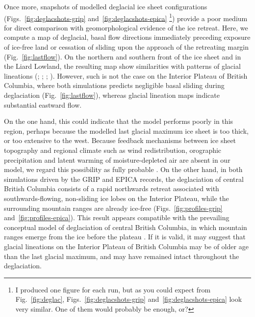 \documentclass[tc, manuscript]{copernicus}
\begin{document}
Once more, snapshots of modelled deglacial ice sheet configurations
(Figs.~\ref{fig:deglacshots-grip} and~\ref{fig:deglacshots-epica}%
\footnote{I produced one figure for each run, but as you could expect from
    Fig.~\ref{fig:deglac}, Figs.~\ref{fig:deglacshots-grip}
    and~\ref{fig:deglacshots-epica} look very similar. One of them would
    probably be enough, or?}) provide a
poor medium for direct comparison with geomorphological evidence of the ice
retreat. Here, we compute a map of deglacial, basal flow directions immediately
preceding exposure of ice-free land or cessation of sliding upon the approach
of the retreating margin (Fig.~\ref{fig:lastflow}). On the northern and
southern front of the ice sheet and in the Liard Lowland, the resulting map
show similarities with patterns of glacial lineations
(\citealp{Prest.etal.1968}; \citealp[Fig.~1.12]{Clague.1989};
\citealp[Fig.~2]{Kleman.etal.2010}; \citealp[Fig.~2]{Margold.etal.2013}).
However, such is not the case on the Interior Plateau of British Columbia,
where both simulations predicts negligible basal sliding during deglaciation
(Fig.~\ref{fig:lastflow}), whereas glacial lineation maps indicate substantial
eastward flow.

On the one hand, this could indicate that the model performs poorly in this
region, perhaps because the modelled last glacial maximum ice sheet is too
thick, or too extensive to the west. Because feedback mechanisms between ice
sheet topography and regional climate such as wind redistribution, orographic
precipitation and latent warming of moisture-depleted air are absent in our
model, we regard this possibility as fully probable \citep{Seguinot.etal.2014}.
On the other hand, in both simulations driven by the GRIP and EPICA records,
the deglaciation of central British Columbia consists of a rapid northwards
retreat associated with southwards-flowing, non-sliding ice lobes on the
Interior Plateau, while the surrounding mountain ranges are already ice-free
(Figs.~\ref{fig:profiles-grip} and~\ref{fig:profiles-epica}). This result
appears compatible with the prevailing conceptual model of deglaciation of
central British Columbia, in which mountain ranges emerge from the ice before
the plateau \citep[Fig.~7]{Fulton.1991}. If it is valid, it may suggest that
glacial lineations on the Interior Plateau of British Columbia may be of older
age than the last glacial maximum, and may have remained intact throughout the
deglaciation.


\conclusions
\label{sec:concl}
\end{document}
